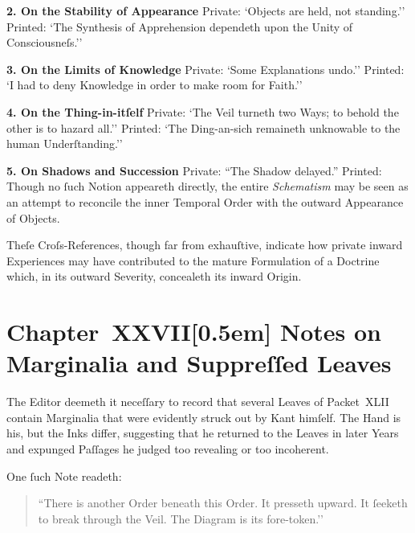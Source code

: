 \documentclass[12pt]{book}
\begin{document}
\noindent\textbf{2. On the Stability of Appearance}
Private: `Objects are held, not standing.''  
Printed: `The Synthesis of Apprehension dependeth upon the Unity of Consciousneſs.’’

\medskip

\noindent\textbf{3. On the Limits of Knowledge}
Private: `Some Explanations undo.''  
Printed: `I had to deny Knowledge in order to make room for Faith.''

\medskip

\noindent\textbf{4. On the Thing-in-itſelf}
Private: `The Veil turneth two Ways; to behold the other is to hazard all.’’  
Printed: `The Ding-an-sich remaineth unknowable to the human Underſtanding.’’

\medskip

\noindent\textbf{5. On Shadows and Succession}
Private: ``The Shadow delayed.''
Printed: Though no ſuch Notion appeareth directly, the entire \textit{Schematism} may be seen as an attempt to reconcile the inner Temporal Order with the outward Appearance of Objects.

\medskip

\noindent Theſe Croſs-References, though far from exhauſtive, indicate how private inward Experiences may have contributed to the mature Formulation of a Doctrine which, in its outward Severity, concealeth its inward Origin.


\chapter*{Chapter~XXVII[0.5em]
Notes on Marginalia and Suppreſſed Leaves}


The Editor deemeth it neceſſary to record that several Leaves of Packet~XLII contain Marginalia that were evidently struck out by Kant himſelf. The Hand is his, but the Inks differ, suggesting that he returned to the Leaves in later Years and expunged Paſſages he judged too revealing or too incoherent.

One ſuch Note readeth:

\begin{quote}
``There is another Order beneath this Order. It presseth upward. It ſeeketh to break through the Veil. The Diagram is its fore-token.’’
\end{quote}
\end{document}
